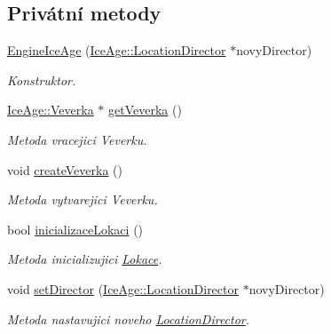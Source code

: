 \subsection*{Privátní metody}
\begin{DoxyCompactItemize}
\item 
\hyperlink{classIceAge_1_1EngineIceAge_a3d8cd1fe7b887a32a80583237352a1cc}{Engine\+Ice\+Age} (\hyperlink{classIceAge_1_1LocationDirector}{Ice\+Age\+::\+Location\+Director} $\ast$novy\+Director)
\begin{DoxyCompactList}\small\item\em Konstruktor. \end{DoxyCompactList}\item 
\hyperlink{classIceAge_1_1Veverka}{Ice\+Age\+::\+Veverka} $\ast$ \hyperlink{classIceAge_1_1EngineIceAge_a89b47698ead7c1c8b9c5b8bd006980f2}{get\+Veverka} ()
\begin{DoxyCompactList}\small\item\em Metoda vracejici Veverku. \end{DoxyCompactList}\item 
void \hyperlink{classIceAge_1_1EngineIceAge_a2766d0bc71efd5d3b6d76fc906b32952}{create\+Veverka} ()
\begin{DoxyCompactList}\small\item\em Metoda vytvarejici Veverku. \end{DoxyCompactList}\item 
bool \hyperlink{classIceAge_1_1EngineIceAge_a28ec183df6eabbc19b3f3950caa0f059}{inicializace\+Lokaci} ()
\begin{DoxyCompactList}\small\item\em Metoda inicializujici \hyperlink{classIceAge_1_1Lokace}{Lokace}. \end{DoxyCompactList}\item 
void \hyperlink{classIceAge_1_1EngineIceAge_ab3f8cd94dafb051af4e751fb34914cb2}{set\+Director} (\hyperlink{classIceAge_1_1LocationDirector}{Ice\+Age\+::\+Location\+Director} $\ast$novy\+Director)
\begin{DoxyCompactList}\small\item\em Metoda nastavujici noveho \hyperlink{classIceAge_1_1LocationDirector}{Location\+Director}. \end{DoxyCompactList}\end{DoxyCompactItemize}
